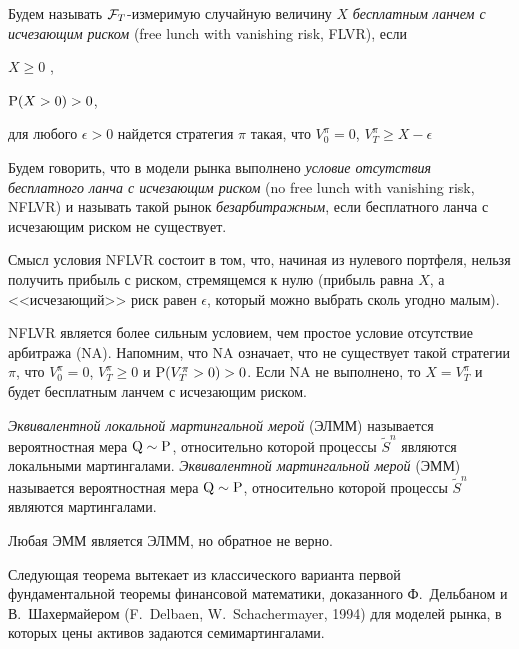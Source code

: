 \begin{definition}
Будем называть $\F_T$-измеримую случайную величину $X$ \emph{бесплатным ланчем с исчезающим риском} (free lunch with vanishing risk, FLVR), если
\begin{alphenum}
\item $X\ge 0$ \as,
\item $\P(X>0)>0$,
\item для любого $\epsilon>0$ найдется стратегия $\pi$ такая, что $V_0^\pi=0$, $V_T^\pi \ge X-\epsilon$ \as
\end{alphenum}

Будем говорить, что в модели рынка выполнено \emph{условие отсутствия бесплатного ланча с исчезающим риском} (no free lunch with vanishing risk, NFLVR) и называть такой рынок \emph{безарбитражным}, если бесплатного ланча с исчезающим риском не существует.
\end{definition}

Смысл условия NFLVR состоит в том, что, начиная из нулевого портфеля, нельзя получить прибыль с риском, стремящемся к нулю (прибыль равна $X$, а <<исчезающий>> риск равен $\epsilon$, который можно выбрать сколь угодно малым).

NFLVR является более сильным условием, чем простое условие отсутствие арбитража (NA).
Напомним, что NA означает, что не существует такой стратегии $\pi$, что $V_0^\pi = 0$, 
$V_T^\pi \ge 0$ и $\P(V_T^\pi > 0) > 0$.
Если NA не выполнено, то $X=V_T^\pi$ и будет бесплатным ланчем с исчезающим риском. 

\begin{definition}
\emph{Эквивалентной локальной мартингальной мерой} (ЭЛММ) называется вероятностная мера $\Q\sim\P$, относительно которой процессы $\tilde S^n$ являются локальными мартингалами.
\emph{Эквивалентной мартингальной мерой} (ЭММ) называется вероятностная мера $\Q\sim\P$, относительно которой процессы $\tilde S^n$ являются мартингалами.
\end{definition}

\begin{remark}
Любая ЭММ является ЭЛММ, но обратное не верно.
\end{remark}

Следующая теорема вытекает из классического варианта первой фундаментальной теоремы финансовой математики, доказанного Ф.~Дельбаном и В.~Шахермайером (F.~Delbaen, W.~Schachermayer, 1994) для моделей рынка, в которых цены активов задаются семимартингалами.

